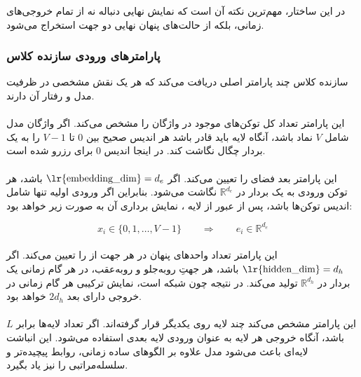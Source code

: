 \documentclass{article}
\begin{document}
در این ساختار، مهم‌ترین نکته آن است که نمایش نهایی دنباله نه از تمام خروجی‌های زمانی، بلکه از حالت‌های پنهان نهایی دو جهت  استخراج می‌شود.

\subsubsection{پارامترهای ورودی سازنده کلاس}

سازنده کلاس  چند پارامتر اصلی دریافت می‌کند که هر یک نقش مشخصی در ظرفیت مدل و رفتار آن دارند.

\paragraph{}
این پارامتر تعداد کل توکن‌های موجود در واژگان را مشخص می‌کند. اگر واژگان مدل شامل \(V\) نماد باشد، آنگاه لایه  باید قادر باشد هر اندیس صحیح بین \(0\) تا \(V-1\) را به یک بردار چگال نگاشت کند. در اینجا اندیس \(0\) برای  رزرو شده است.

\paragraph{}
این پارامتر بعد فضای  را تعیین می‌کند. اگر \(\text{\lr{embedding\_dim}} = d_e\) باشد، هر توکن ورودی به یک بردار در \(\mathbb{R}^{d_e}\) نگاشت می‌شود. بنابراین اگر ورودی اولیه تنها شامل اندیس توکن‌ها باشد، پس از عبور از لایه ، نمایش برداری آن به صورت زیر خواهد بود:

\begin{equation}
	x_i \in \{0,1,\dots,V-1\}
	\qquad \Longrightarrow \qquad
	e_i \in \mathbb{R}^{d_e}
\end{equation}

\paragraph{}
این پارامتر تعداد واحدهای پنهان در هر جهت از  را تعیین می‌کند. اگر \(\text{\lr{hidden\_dim}} = d_h\) باشد، هر جهتِ رو‌به‌جلو و رو‌به‌عقب، در هر گام زمانی یک بردار در \(\mathbb{R}^{d_h}\) تولید می‌کند. در نتیجه چون شبکه  است، نمایش ترکیبی هر گام زمانی در خروجی  دارای بعد \(2d_h\) خواهد بود.

\paragraph{}
این پارامتر مشخص می‌کند چند لایه  روی یکدیگر قرار گرفته‌اند. اگر تعداد لایه‌ها برابر \(L\) باشد، آنگاه خروجی هر لایه به عنوان ورودی لایه بعدی استفاده می‌شود. این انباشت لایه‌ای باعث می‌شود مدل علاوه بر الگوهای ساده زمانی، روابط پیچیده‌تر و سلسله‌مراتبی را نیز یاد بگیرد.
\end{document}
